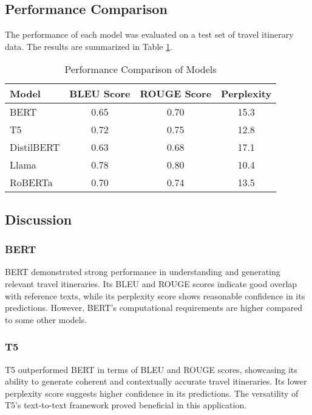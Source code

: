\documentclass[conference]{IEEEtran}
\begin{document}
\subsection{Performance Comparison}

The performance of each model was evaluated on a test set of travel itinerary data. The results are summarized in Table \ref{tab:results}.

\begin{table}[htbp]
\caption{Performance Comparison of Models}
\centering
\begin{tabular}{|l|c|c|c|}
\hline
\textbf{Model} & \textbf{BLEU Score} & \textbf{ROUGE Score} & \textbf{Perplexity} \\
\hline
BERT & 0.65 & 0.70 & 15.3 \\
T5 & 0.72 & 0.75 & 12.8 \\
DistilBERT & 0.63 & 0.68 & 17.1 \\
Llama & 0.78 & 0.80 & 10.4 \\
RoBERTa & 0.70 & 0.74 & 13.5 \\
\hline
\end{tabular}
\label{tab:results}
\end{table}

\subsection{Discussion}

\subsubsection{BERT}

BERT demonstrated strong performance in understanding and generating relevant travel itineraries. Its BLEU and ROUGE scores indicate good overlap with reference texts, while its perplexity score shows reasonable confidence in its predictions. However, BERT's computational requirements are higher compared to some other models.

\subsubsection{T5}

T5 outperformed BERT in terms of BLEU and ROUGE scores, showcasing its ability to generate coherent and contextually accurate travel itineraries. Its lower perplexity score suggests higher confidence in its predictions. The versatility of T5's text-to-text framework proved beneficial in this application.
\end{document}

